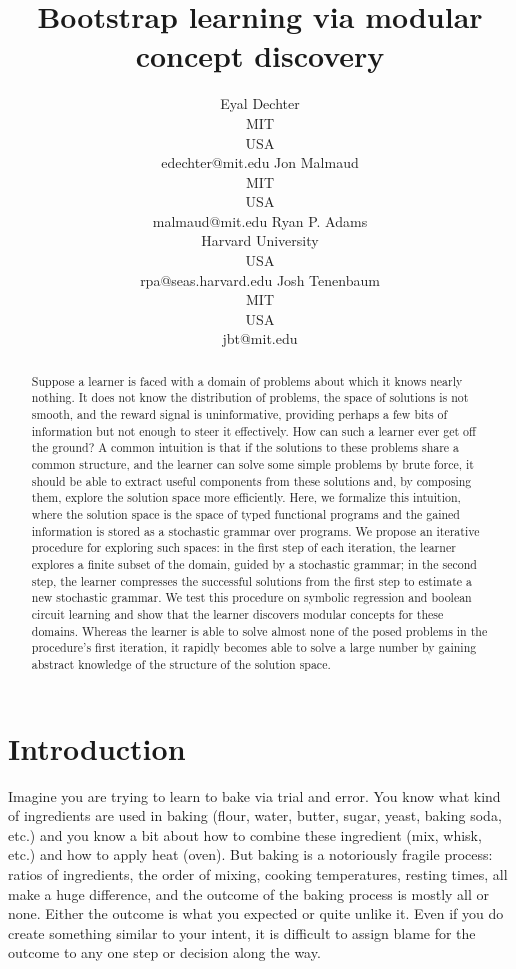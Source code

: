 \documentclass{article}
\title{Bootstrap learning via modular concept discovery}
\author{Eyal Dechter \\
MIT\\
USA \\
edechter@mit.edu
\And
Jon Malmaud \\
MIT \\ 
USA \\
malmaud@mit.edu
\And 
Ryan P.  Adams \\
Harvard University\\
USA \\
rpa@seas.harvard.edu
\And
Josh Tenenbaum \\
MIT\\
USA \\
jbt@mit.edu
}
\begin{document}
\maketitle

\begin{abstract}
 Suppose a learner is faced with a domain of problems about which it
 knows nearly nothing. It does not know the distribution of problems,
 the space of solutions is not smooth, and the reward signal is
 uninformative, providing perhaps a few bits of information but not
 enough to steer it effectively. How can such a learner ever get off
 the ground? A common intuition is that if the solutions to these
 problems share a common structure, and the learner can solve some
 simple problems by brute force, it should be able to extract useful
 components from these solutions and, by composing them, explore the
 solution space more efficiently. Here, we formalize this intuition,
 where the solution space is the space of typed functional programs
 and the gained information is stored as a stochastic grammar over
 programs. We propose an iterative procedure for exploring such
 spaces: in the first step of each iteration, the learner explores a
 finite subset of the domain, guided by a stochastic grammar; in the
 second step, the learner compresses the successful solutions from the
 first step to estimate a new stochastic grammar. We test this
 procedure on symbolic regression and boolean circuit learning and
 show that the learner discovers modular concepts for these
 domains. Whereas the learner is able to solve almost none of the
 posed problems in the procedure's first iteration, it rapidly becomes
 able to solve a large number by gaining abstract knowledge of the
 structure of the solution space.
 
 
\end{abstract}

\section{Introduction}

Imagine you are trying to learn to bake via trial and error. You know
what kind of ingredients are used in baking (flour, water, butter,
sugar, yeast, baking soda, etc.) and you know a bit about how to
combine these ingredient (mix, whisk, etc.) and how to apply heat
(oven). But baking is a notoriously fragile process: ratios of
ingredients, the order of mixing, cooking temperatures, resting times,
all make a huge difference, and the outcome of the baking process is
mostly all or none. Either the outcome is what you expected or quite
unlike it. Even if you do create something similar to your intent, it
is difficult to assign blame for the outcome to any one step or
decision along the way.
\end{document}
